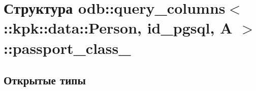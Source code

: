 \hypertarget{structodb_1_1query__columns_3_01_1_1kpk_1_1data_1_1_person_00_01id__pgsql_00_01_a_01_4_1_1passport__class__}{}\section{Структура odb\+:\+:query\+\_\+columns$<$ \+:\+:kpk\+:\+:data\+:\+:Person, id\+\_\+pgsql, A $>$\+:\+:passport\+\_\+class\+\_\+}
\label{structodb_1_1query__columns_3_01_1_1kpk_1_1data_1_1_person_00_01id__pgsql_00_01_a_01_4_1_1passport__class__}
\subsection*{Открытые типы}
